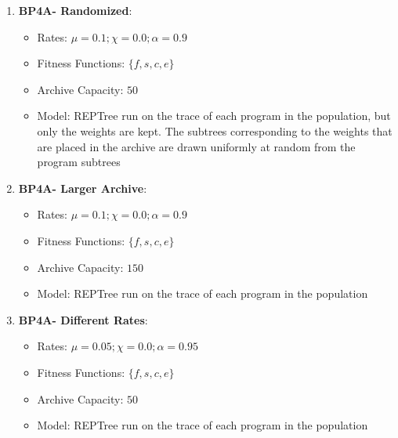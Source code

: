 \begin{enumerate}
\item \textbf{BP4A- Randomized}: 
\begin{itemize}[noitemsep]
\item Rates: $\mu = 0.1; \chi = 0.0; \alpha = 0.9$
\item Fitness Functions: $\{f, s, c, e\}$
\item Archive Capacity: $50$
\item Model: REPTree run on the trace of each program in the population, but only the weights are kept.  The subtrees corresponding to the weights that are placed in the archive are drawn uniformly at random from the program subtrees\end{itemize}

\item \textbf{BP4A- Larger Archive}: 
\begin{itemize}[noitemsep]
\item Rates: $\mu = 0.1; \chi = 0.0; \alpha = 0.9$
\item Fitness Functions: $\{f, s, c, e\}$
\item Archive Capacity: $150$
\item Model: REPTree run on the trace of each program in the population
\end{itemize}

\item \textbf{BP4A- Different Rates}: 
\begin{itemize}[noitemsep]
\item Rates: $\mu = 0.05; \chi = 0.0; \alpha = 0.95$
\item Fitness Functions: $\{f, s, c, e\}$
\item Archive Capacity: $50$
\item Model: REPTree run on the trace of each program in the population
\end{itemize}

\end{enumerate}


